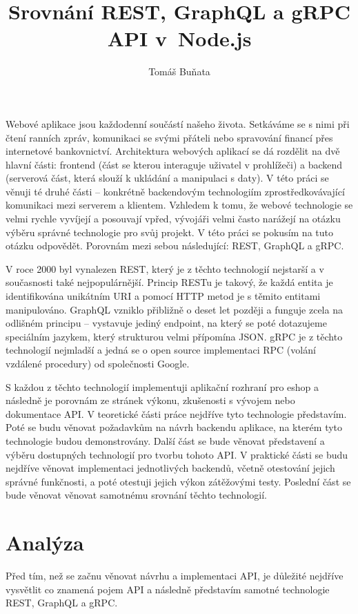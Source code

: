 \documentclass[thesis=M,czech]{FITthesis}[2019/12/23]
\title{Srovnání REST, GraphQL a gRPC API v~Node.js}
\author{Tomáš Buňata} %
\begin{document}

\begin{introduction}
Webové aplikace jsou každodenní součástí našeho života. Setkáváme se s nimi při čtení ranních zpráv, komunikaci se svými přáteli nebo spravování financí přes internetové bankovnictví.
Architektura webových aplikací se dá rozdělit na dvě hlavní části: frontend (část se kterou interaguje uživatel v prohlížeči) a backend (serverová část, která slouží k ukládání a manipulaci s daty). V této práci se věnuji té druhé části -- konkrétně backendovým technologiím zprostředkovávající komunikaci mezi serverem a klientem.
Vzhledem k tomu, že webové technologie se velmi rychle vyvíjejí a posouvají vpřed, vývojáři velmi často narážejí na otázku výběru správné technologie pro svůj projekt. V této práci se pokusím na tuto otázku odpovědět. Porovnám mezi sebou následující: REST, GraphQL a gRPC.

V roce 2000 byl vynalezen REST, který je z těchto technologií nejstarší a v současnosti také nejpopulárnější. Princip RESTu je takový, že každá entita je identifikována unikátním URI a pomocí HTTP metod je s těmito entitami manipulováno.
GraphQL vzniklo přibližně o deset let později a funguje zcela na odlišném principu -- vystavuje jediný endpoint, na který se poté dotazujeme speciálním jazykem, který strukturou velmi přípomína JSON.
gRPC je z těchto technologií nejmladší a jedná se o open source implementaci RPC (volání vzdálené procedury) od společnosti Google.

S každou z těchto technologií implementuji aplikační rozhraní pro eshop a následně je porovnám ze stránek výkonu, zkušenosti s vývojem nebo dokumentace API.
V teoretické části práce nejdříve tyto technologie představím. Poté se budu věnovat požadavkům na návrh backendu aplikace, na kterém tyto technologie budou demonstrovány. Další část se bude věnovat představení a výběru dostupných technologií pro tvorbu tohoto API.
V praktické části se budu nejdříve věnovat implementaci jednotlivých backendů, včetně otestování jejich správné funkčnosti, a poté otestuji jejich výkon zátěžovými testy. Poslední část se bude věnovat věnovat samotnému srovnání těchto technologií.

\end{introduction}

\chapter{Analýza}
Před tím, než se začnu věnovat návrhu a implementaci API, je důležité nejdříve vysvětlit co znamená pojem API a následně představím samotné technologie REST, GraphQL a gRPC.
\end{document}
